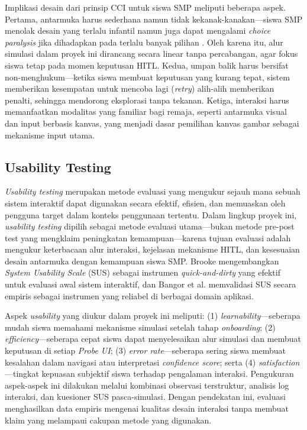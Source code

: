 \documentclass[12pt,a4paper,oneside,openany]{report}
\begin{document}
Implikasi desain dari prinsip CCI untuk siswa SMP meliputi beberapa aspek. Pertama, antarmuka harus sederhana namun tidak kekanak-kanakan---siswa SMP menolak desain yang terlalu infantil namun juga dapat mengalami \textit{choice paralysis} jika dihadapkan pada terlalu banyak pilihan \cite{ref2}. Oleh karena itu, alur simulasi dalam proyek ini dirancang secara linear tanpa percabangan, agar fokus siswa tetap pada momen keputusan HITL. Kedua, umpan balik harus bersifat non-menghukum---ketika siswa membuat keputusan yang kurang tepat, sistem memberikan kesempatan untuk mencoba lagi (\textit{retry}) alih-alih memberikan penalti, sehingga mendorong eksplorasi tanpa tekanan. Ketiga, interaksi harus memanfaatkan modalitas yang familiar bagi remaja, seperti antarmuka visual dan input berbasis kanvas, yang menjadi dasar pemilihan kanvas gambar sebagai mekanisme input utama.

\subsection{Usability Testing}
\label{subsec:usability-testing}

\textit{Usability testing} merupakan metode evaluasi yang mengukur sejauh mana sebuah sistem interaktif dapat digunakan secara efektif, efisien, dan memuaskan oleh pengguna target dalam konteks penggunaan tertentu. Dalam lingkup proyek ini, \textit{usability testing} dipilih sebagai metode evaluasi utama---bukan metode pre-post test yang mengklaim peningkatan kemampuan---karena tujuan evaluasi adalah mengukur keterbacaan alur interaksi, kejelasan mekanisme HITL, dan kesesuaian desain antarmuka dengan kemampuan siswa SMP. Brooke \cite{ref31} mengembangkan \textit{System Usability Scale} (SUS) sebagai instrumen \textit{quick-and-dirty} yang efektif untuk evaluasi awal sistem interaktif, dan Bangor et al. \cite{ref32} memvalidasi SUS secara empiris sebagai instrumen yang reliabel di berbagai domain aplikasi.

Aspek \textit{usability} yang diukur dalam proyek ini meliputi: (1) \textit{learnability}---seberapa mudah siswa memahami mekanisme simulasi setelah tahap \textit{onboarding}; (2) \textit{efficiency}---seberapa cepat siswa dapat menyelesaikan alur simulasi dan membuat keputusan di setiap \textit{Probe UI}; (3) \textit{error rate}---seberapa sering siswa membuat kesalahan dalam navigasi atau interpretasi \textit{confidence score}; serta (4) \textit{satisfaction}---tingkat kepuasan subjektif siswa terhadap pengalaman interaksi. Pengukuran aspek-aspek ini dilakukan melalui kombinasi observasi terstruktur, analisis log interaksi, dan kuesioner SUS pasca-simulasi. Dengan pendekatan ini, evaluasi menghasilkan data empiris mengenai kualitas desain interaksi tanpa membuat klaim yang melampaui cakupan metode yang digunakan.
\end{document}
